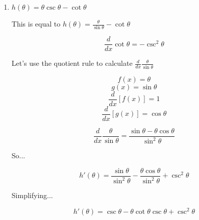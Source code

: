 \documentclass{article}
\begin{document}
\begin{enumerate}
		\item $h(\theta) = \theta \csc \theta - \cot \theta$

			This is equal to $h(\theta) = \frac{\theta}{\sin \theta} - \cot \theta$

			$$\frac{d}{dx} \cot \theta = - \csc^{2} \theta$$

			Let's use the quotient rule to calculate $\frac{d}{dx} \frac{\theta}{\sin \theta}$

			$$f(x) = \theta$$
			$$g(x) = \sin \theta$$
			$$\frac{d}{dx} [f(x)] = 1$$
			$$\frac{d}{dx} [g(x)] = \cos \theta$$

			$$\frac{d}{dx} \frac{\theta}{\sin \theta} = \frac{\sin \theta - \theta \cos \theta}{\sin^{2} \theta}$$

			So...

			$$h'(\theta) = \frac{\sin \theta}{\sin^{2} \theta} - \frac{\theta \cos \theta}{\sin^{2} \theta} + \csc^{2} \theta$$

			Simplifying...

			$$h'(\theta) = \csc \theta - \theta \cot \theta \csc \theta + \csc^{2} \theta$$
	\end{enumerate}
\end{document}
